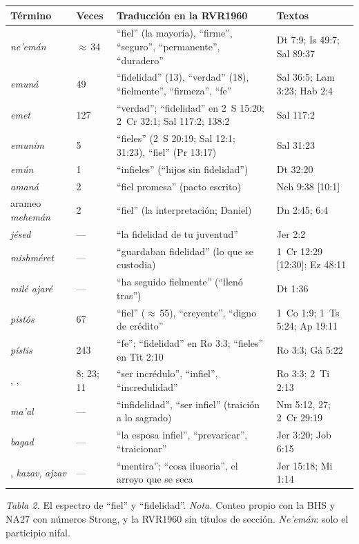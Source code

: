 \begin{center}\small\renewcommand{\arraystretch}{1.16}
\begin{tabular}{@{}L{3.6cm}L{1.3cm}L{5.2cm}L{4.4cm}@{}}
\toprule
\textbf{Término} & \textbf{Veces} & \textbf{Traducción en la RVR1960} & \textbf{Textos} \\ \midrule
{} \emph{ne'emán} & $\approx$\,34 & ``fiel'' (la mayoría), ``firme'', ``seguro'', ``permanente'', ``duradero'' & Dt 7:9; Is 49:7; Sal 89:37 \\
 \emph{emuná} & 49 & ``fidelidad'' (13), ``verdad'' (18), ``fielmente'', ``firmeza'', ``fe'' & Sal 36:5; Lam 3:23; Hab 2:4 \\
 \emph{emet} & 127 & ``verdad''; ``fidelidad'' en 2~S 15:20; 2~Cr 32:1; Sal 117:2; 138:2 & Sal 117:2 \\
 \emph{emunim} & 5 & ``fieles'' (2~S 20:19; Sal 12:1; 31:23), ``fiel'' (Pr 13:17) & Sal 31:23 \\
 \emph{emún} & 1 & ``infieles'' (``hijos sin fidelidad'') & Dt 32:20 \\
 \emph{amaná} & 2 & ``fiel promesa'' (pacto escrito) & Neh 9:38 [10:1] \\
arameo  \emph{mehemán} & 2 & ``fiel'' (la interpretación; Daniel) & Dn 2:45; 6:4 \\
 \emph{jésed} & --- & ``la fidelidad de tu juventud'' & Jer 2:2 \\
 \emph{mishméret} & --- & ``guardaban fidelidad'' (lo que se custodia) & 1~Cr 12:29 [12:30]; Ez 48:11 \\
 \emph{milé ajaré} & --- & ``ha seguido fielmente'' (``llenó tras'') & Dt 1:36 \\ \midrule
{} \emph{pistós} & 67 & ``fiel'' ($\approx$\,55), ``creyente'', ``digno de crédito'' & 1~Co 1:9; 1~Ts 5:24; Ap 19:11 \\
 \emph{pístis} & 243 & ``fe''; ``fidelidad'' en Ro 3:3; ``fieles'' en Tit 2:10 & Ro 3:3; Gá 5:22 \\
, ,  & 8; 23; 11 & ``ser incrédulo'', ``infiel'', ``incredulidad'' & Ro 3:3; 2~Ti 2:13 \\ \midrule
{} \emph{ma'al} & --- & ``infidelidad'', ``ser infiel'' (traición a lo sagrado) & Nm 5:12, 27; 2~Cr 29:19 \\
 \emph{bagad} & --- & ``la esposa infiel'', ``prevaricar'', ``traicionar'' & Jer 3:20; Job 6:15 \\
,  \emph{kazav}, \emph{ajzav} & --- & ``mentira''; ``cosa ilusoria'', el arroyo que se seca & Jer 15:18; Mi 1:14 \\
\bottomrule
\end{tabular}\par
{\footnotesize\color{gris}\textit{Tabla 2.} El espectro de ``fiel'' y ``fidelidad''. \textit{Nota.} Conteo propio con la BHS y NA27 con números Strong, y la RVR1960 sin títulos de sección. \emph{Ne'emán}: solo el participio nifal.}
\end{center}

